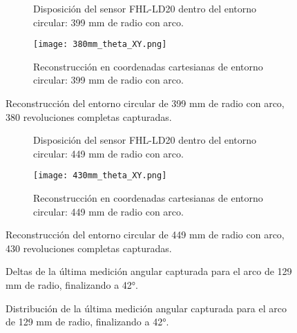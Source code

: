 \begin{figure}[H]
	\centering
	\begin{subfigure}{0.45\textwidth}
		\centering
		\caption{Disposición del sensor FHL-LD20 dentro del entorno circular: 399 mm de radio con arco.}
		\label{fig:disposicion_lidar_theta6}
	\end{subfigure}
	\hspace{1em}
	\begin{subfigure}{0.45\textwidth}
		\centering
		\texttt{[image: 380mm\_theta\_XY.png]}
		\caption{Reconstrucción en coordenadas cartesianas de entorno circular: 399 mm de radio con arco.}
		\label{fig:399m_radius_xy_theta6}
	\end{subfigure}
	\caption{Reconstrucción del entorno circular de 399 mm de radio con arco, 380 revoluciones completas capturadas.}
	\label{fig:disposicion_lidar_var_theta6}
\end{figure}


\begin{figure}[H]
	\centering
	\begin{subfigure}{0.45\textwidth}
		\centering
		\caption{Disposición del sensor FHL-LD20 dentro del entorno circular: 449 mm de radio con arco.}
		\label{fig:disposicion_lidar_theta7}
	\end{subfigure}
	\hspace{1em}
	\begin{subfigure}{0.45\textwidth}
		\centering
		\texttt{[image: 430mm\_theta\_XY.png]}
		\caption{Reconstrucción en coordenadas cartesianas de entorno circular: 449 mm de radio con arco.}
		\label{fig:449m_radius_xy_theta7}
	\end{subfigure}
	\caption{Reconstrucción del entorno circular de 449 mm de radio con arco, 430 revoluciones completas capturadas.}
	\label{fig:disposicion_lidar_var_theta7}
\end{figure}

\begin{figure}[H]
	\centering
	\caption{Deltas de la última medición angular capturada para el arco de 129 mm de radio, finalizando a 42°.}
	\label{fig:lecturas_theta42_1}
\end{figure}

\begin{figure}[H]
	\centering
	\caption{Distribución de la última medición angular capturada para el arco de 129 mm de radio, finalizando a 42°.}
	\label{fig:histograma_theta42_1}
\end{figure}


